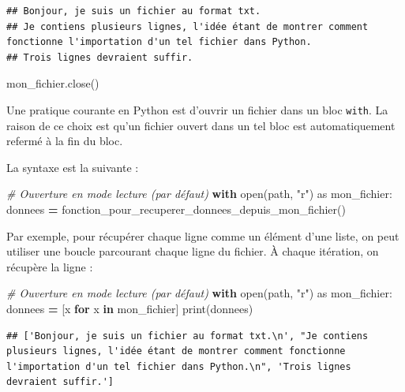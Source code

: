 \documentclass[
  12pt,
]{book}
\newenvironment{Shaded}{\begin{snugshade}}{\end{snugshade}}
\newcommand{\BuiltInTok}[1]{#1}
\newcommand{\CommentTok}[1]{\textcolor[rgb]{0.56,0.35,0.01}{\textit{#1}}}
\newcommand{\ControlFlowTok}[1]{\textcolor[rgb]{0.13,0.29,0.53}{\textbf{#1}}}
\newcommand{\ImportTok}[1]{#1}
\newcommand{\KeywordTok}[1]{\textcolor[rgb]{0.13,0.29,0.53}{\textbf{#1}}}
\newcommand{\NormalTok}[1]{#1}
\newcommand{\OperatorTok}[1]{\textcolor[rgb]{0.81,0.36,0.00}{\textbf{#1}}}
\newcommand{\StringTok}[1]{\textcolor[rgb]{0.31,0.60,0.02}{#1}}
\numberwithin{equation}{section}
\numberwithin{countremarque}{section}
\begin{document}
\begin{lstlisting}
## Bonjour, je suis un fichier au format txt.
## Je contiens plusieurs lignes, l'idée étant de montrer comment fonctionne l'importation d'un tel fichier dans Python.
## Trois lignes devraient suffir.
\end{lstlisting}

\begin{Shaded}
\begin{Highlighting}[]
\NormalTok{mon\_fichier.close()}
\end{Highlighting}
\end{Shaded}

Une pratique courante en Python est d'ouvrir un fichier dans un bloc \texttt{with}. La raison de ce choix est qu'un fichier ouvert dans un tel bloc est automatiquement refermé à la fin du bloc.

La syntaxe est la suivante :

\begin{Shaded}
\begin{Highlighting}[]
\CommentTok{\# Ouverture en mode lecture (par défaut)}
\ControlFlowTok{with} \BuiltInTok{open}\NormalTok{(path, }\StringTok{"r"}\NormalTok{) }\ImportTok{as}\NormalTok{ mon\_fichier:}
\NormalTok{  donnees }\OperatorTok{=}\NormalTok{ fonction\_pour\_recuperer\_donnees\_depuis\_mon\_fichier()}
\end{Highlighting}
\end{Shaded}

Par exemple, pour récupérer chaque ligne comme un élément d'une liste, on peut utiliser une boucle parcourant chaque ligne du fichier. À chaque itération, on récupère la ligne :

\begin{Shaded}
\begin{Highlighting}[]
\CommentTok{\# Ouverture en mode lecture (par défaut)}
\ControlFlowTok{with} \BuiltInTok{open}\NormalTok{(path, }\StringTok{"r"}\NormalTok{) }\ImportTok{as}\NormalTok{ mon\_fichier:}
\NormalTok{  donnees }\OperatorTok{=}\NormalTok{ [x }\ControlFlowTok{for}\NormalTok{ x }\KeywordTok{in}\NormalTok{ mon\_fichier]}
\BuiltInTok{print}\NormalTok{(donnees)}
\end{Highlighting}
\end{Shaded}

\begin{lstlisting}
## ['Bonjour, je suis un fichier au format txt.\n', "Je contiens plusieurs lignes, l'idée étant de montrer comment fonctionne l'importation d'un tel fichier dans Python.\n", 'Trois lignes devraient suffir.']
\end{lstlisting}
\end{document}
